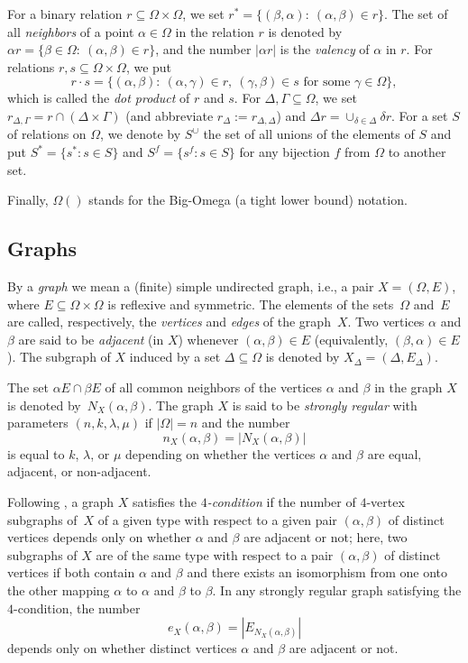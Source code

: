 \documentclass{amsart}
\begin{document}
For a binary relation $r\subseteq\Omega\times\Omega$, we set 
$r^*=\{(\beta,\alpha)\colon\ (\alpha,\beta)\in r\}$. The set of all {\it neighbors} of a point $\alpha\in\Omega$ in the relation $r$ is denoted by $\alpha r=\{\beta\in\Omega\colon\ (\alpha,\beta)\in r\}$, 
and the number $|\alpha r|$ is the \emph{valency} of $\alpha$ in $r$. 
For relations $r,s\subseteq\Omega\times\Omega$, we put 
$$
r\cdot s=\{(\alpha,\beta)\colon\ (\alpha,\gamma)\in r,\ (\gamma,\beta)\in s\text{ for some }\gamma\in\Omega\},
$$ 
which is called the \emph{dot product} of $r$ and $s$.
For $\Delta,\Gamma\subseteq \Omega$, we set $r_{\Delta,\Gamma}=r\cap (\Delta\times \Gamma)$ (and abbreviate $r_{\Delta}:=r_{\Delta,\Delta}$) and 
$\Delta r=\cup_{\delta\in \Delta}\delta r$. 
For a set $S$ of relations on $\Omega$, 
we denote by $S^\cup$ the set of all unions of the elements of $S$ and 
put $S^*=\{s^*\colon s\in S\}$ and $S^f=\{s^f\colon s\in S\}$ for any bijection $f$ from $\Omega$ 
to another set.

Finally, $\mathsf{\Omega}()$ stands for 
the Big-Omega (a tight lower bound) notation.


\subsection{Graphs}
By a {\it graph} we mean a (finite) simple undirected graph, i.e., a pair $X=(\Omega,E)$, where $E\subseteq \Omega\times \Omega$ is reflexive and symmetric. The elements of  the sets~$\Omega$ and~$E$ are called, respectively, the {\it vertices} and {\it edges} of the graph~$X$. Two vertices $\alpha$ and $\beta$ are said to be {\it adjacent} (in $X$) whenever $(\alpha,\beta)\in E$ (equivalently, $(\beta,\alpha)\in E$). The subgraph of $X$ induced by a set $\Delta\subseteq \Omega$ is denoted by $X_{\Delta}=(\Delta,E_{\Delta})$.

The set $\alpha E\cap\beta E$ of all common neighbors of the vertices $\alpha$ and $\beta$ in the graph $X$ is denoted by~$N_X(\alpha,\beta)$. The graph $X$ is said to be {\it strongly regular} with parameters $(n,k,\lambda,\mu)$ if $|\Omega|=n$ and  the number
$$
n_X(\alpha,\beta)=|N_X(\alpha,\beta)|
$$
is equal to $k$, $\lambda$,  or $\mu$ depending on whether the vertices $\alpha$ and $\beta$ are equal, adjacent, or non-adjacent.  

Following  \cite[Section 4]{HestH1971}, a graph $X$ satisfies the {\it $4$-condition} if   the number of $4$-vertex subgraphs of~$X$ of a given type with respect to a given pair $(\alpha,\beta)$ of distinct vertices depends only on whether $\alpha$ and $\beta$ are adjacent or not; here, two subgraphs of $X$ are of the same type with respect to  a  pair $(\alpha,\beta)$ of distinct vertices if both contain $\alpha$ and $\beta$ and there exists an isomorphism from one onto the other 
mapping $\alpha$ to $\alpha$ and $\beta$ to $\beta$. 
In any strongly regular graph satisfying the $4$-condition, 
the number
$$
e_X(\alpha,\beta)=|E_{N_X(\alpha,\beta)}|
$$
depends only on whether distinct vertices $\alpha$ and $\beta$ are adjacent or not.
\end{document}
